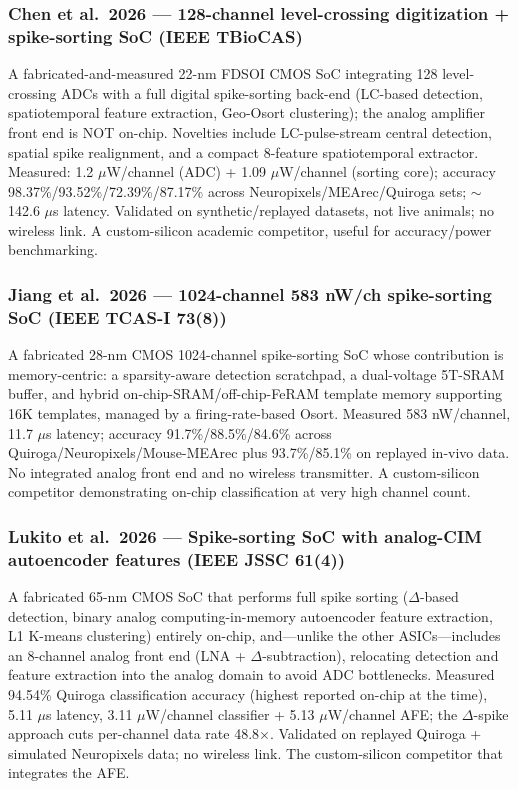 \documentclass[11pt]{article}
\begin{document}
\subsubsection*{Chen et al.\ 2026 --- 128-channel level-crossing digitization + spike-sorting SoC (IEEE TBioCAS)}
A fabricated-and-measured 22-nm FDSOI CMOS SoC integrating 128 level-crossing ADCs with a full digital spike-sorting back-end (LC-based detection, spatiotemporal feature extraction, Geo-Osort clustering); the analog amplifier front end is NOT on-chip. Novelties include LC-pulse-stream central detection, spatial spike realignment, and a compact 8-feature spatiotemporal extractor. Measured: 1.2 $\mu$W/channel (ADC) + 1.09 $\mu$W/channel (sorting core); accuracy 98.37\%/93.52\%/72.39\%/87.17\% across Neuropixels/MEArec/Quiroga sets; $\sim$142.6 $\mu$s latency. Validated on synthetic/replayed datasets, not live animals; no wireless link. A custom-silicon academic competitor, useful for accuracy/power benchmarking.

\subsubsection*{Jiang et al.\ 2026 --- 1024-channel 583 nW/ch spike-sorting SoC (IEEE TCAS-I 73(8))}
A fabricated 28-nm CMOS 1024-channel spike-sorting SoC whose contribution is memory-centric: a sparsity-aware detection scratchpad, a dual-voltage 5T-SRAM buffer, and hybrid on-chip-SRAM/off-chip-FeRAM template memory supporting 16K templates, managed by a firing-rate-based Osort. Measured 583 nW/channel, 11.7 $\mu$s latency; accuracy 91.7\%/88.5\%/84.6\% across Quiroga/Neuropixels/Mouse-MEArec plus 93.7\%/85.1\% on replayed in-vivo data. No integrated analog front end and no wireless transmitter. A custom-silicon competitor demonstrating on-chip classification at very high channel count.

\subsubsection*{Lukito et al.\ 2026 --- Spike-sorting SoC with analog-CIM autoencoder features (IEEE JSSC 61(4))}
A fabricated 65-nm CMOS SoC that performs full spike sorting ($\Delta$-based detection, binary analog computing-in-memory autoencoder feature extraction, L1 K-means clustering) entirely on-chip, and---unlike the other ASICs---includes an 8-channel analog front end (LNA + $\Delta$-subtraction), relocating detection and feature extraction into the analog domain to avoid ADC bottlenecks. Measured 94.54\% Quiroga classification accuracy (highest reported on-chip at the time), 5.11 $\mu$s latency, 3.11 $\mu$W/channel classifier + 5.13 $\mu$W/channel AFE; the $\Delta$-spike approach cuts per-channel data rate 48.8$\times$. Validated on replayed Quiroga + simulated Neuropixels data; no wireless link. The custom-silicon competitor that integrates the AFE.
\end{document}
